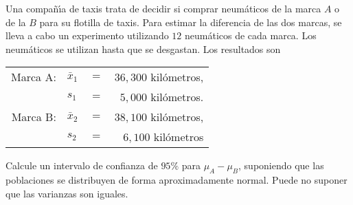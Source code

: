\begin{enunciado}
 Una compa\~n\'{\i}a de taxis trata de decidir si comprar neum\'aticos de la marca $A$ o de la $B$ para su flotilla de taxis. Para estimar la diferencia de las dos marcas, se lleva a cabo un experimento utilizando $12$ neum\'aticos de cada marca. Los neum\'aticos se utilizan hasta que se desgastan. Los resultados son
 \begin{center}
  \begin{tabular}{rlcr}
   Marca A: & $\bar{x}_1$ & $=$ & $36,300$ kil\'ometros, \\
   & $s_1$ & $=$ & $5,000$ kil\'ometros. \\
   Marca B: & $\bar{x}_2$ & $=$ & $38,100$ kil\'ometros, \\
   & $s_2$ & $=$ & $6,100$ kil\'ometros
  \end{tabular}
 \end{center}
 Calcule un intervalo de confianza de $95\%$ para $\mu_A - \mu_B$, suponiendo que las poblaciones se distribuyen de forma aproximadamente normal. Puede no suponer que las varianzas son iguales.
\end{enunciado}

